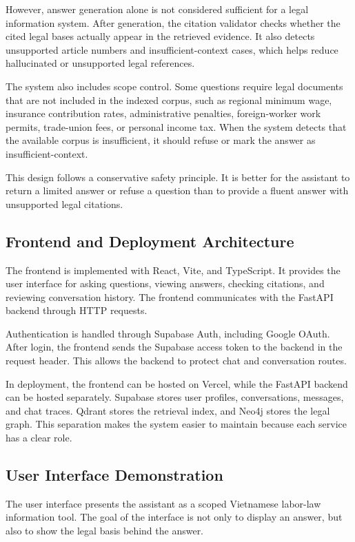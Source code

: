 However, answer generation alone is not considered sufficient for a legal information system. After generation, the citation validator checks whether the cited legal bases actually appear in the retrieved evidence. It also detects unsupported article numbers and insufficient-context cases, which helps reduce hallucinated or unsupported legal references.

The system also includes scope control. Some questions require legal documents that are not included in the indexed corpus, such as regional minimum wage, insurance contribution rates, administrative penalties, foreign-worker work permits, trade-union fees, or personal income tax. When the system detects that the available corpus is insufficient, it should refuse or mark the answer as insufficient-context.

This design follows a conservative safety principle. It is better for the assistant to return a limited answer or refuse a question than to provide a fluent answer with unsupported legal citations.

\subsection{Frontend and Deployment Architecture}

The frontend is implemented with React, Vite, and TypeScript. It provides the user interface for asking questions, viewing answers, checking citations, and reviewing conversation history. The frontend communicates with the FastAPI backend through HTTP requests.

Authentication is handled through Supabase Auth, including Google OAuth. After login, the frontend sends the Supabase access token to the backend in the request header. This allows the backend to protect chat and conversation routes.

In deployment, the frontend can be hosted on Vercel, while the FastAPI backend can be hosted separately. Supabase stores user profiles, conversations, messages, and chat traces. Qdrant stores the retrieval index, and Neo4j stores the legal graph. This separation makes the system easier to maintain because each service has a clear role.

\subsection{User Interface Demonstration}

The user interface presents the assistant as a scoped Vietnamese labor-law information tool. The goal of the interface is not only to display an answer, but also to show the legal basis behind the answer.

